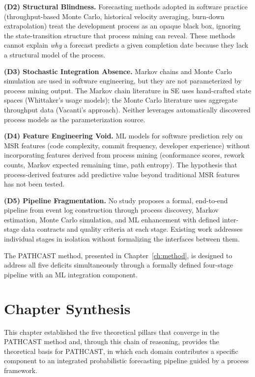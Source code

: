 \textbf{(D2) Structural Blindness.} Forecasting methods adopted in
software practice (throughput-based Monte Carlo, historical velocity
averaging, burn-down extrapolation) treat the development process as
an opaque black box, ignoring the state-transition structure that process
mining can reveal. These methods cannot explain \emph{why} a forecast
predicts a given completion date because they lack a structural model
of the process.

\textbf{(D3) Stochastic Integration Absence.} Markov chains and Monte
Carlo simulation are used in software engineering, but they are not
parameterized by process mining output. The Markov chain literature in
SE uses hand-crafted state spaces (Whittaker's usage models);
the Monte Carlo literature uses aggregate throughput data (Vacanti's
approach). Neither leverages automatically discovered process models as
the parameterization source.

\textbf{(D4) Feature Engineering Void.} ML models for software
prediction rely on MSR features (code complexity, commit frequency,
developer experience) without incorporating features derived from process
mining (conformance scores, rework counts, Markov expected remaining
time, path entropy). The hypothesis that process-derived features add
predictive value beyond traditional MSR features has not been tested.

\textbf{(D5) Pipeline Fragmentation.} No study proposes a formal,
end-to-end pipeline from event log construction through process
discovery, Markov estimation, Monte Carlo simulation, and ML enhancement
with defined inter-stage data contracts and quality criteria at each
stage. Existing work addresses individual stages in isolation without
formalizing the interfaces between them.

The PATHCAST method, presented in Chapter~\ref{ch:method}, is
designed to address all five deficits simultaneously through a formally
defined four-stage pipeline with an ML integration component.


\section{Chapter Synthesis}
\label{sec:ch2-synthesis}

This chapter established the five theoretical pillars that converge in the PATHCAST method and, through this chain of reasoning, provides the theoretical basis for PATHCAST, in which each domain contributes a specific component to an integrated probabilistic forecasting pipeline guided by a process framework.

